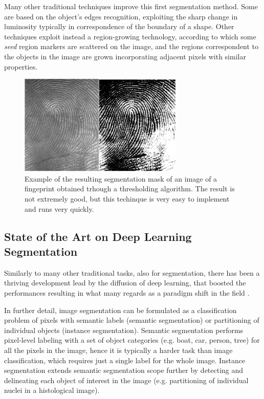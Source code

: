 Many other traditional techniques improve this first segmentation method. Some are based on the object's edges recognition, exploiting the sharp change in luminosity typically in correspondence of the boundary of a shape. Other techniques exploit instead a region-growing technology, according to which some \textit{seed} region markers are scattered on the image, and the regions correspondent to the objects in the image are grown incorporating adjacent pixels with similar properties.

\begin{figure}
    \centering
    \includegraphics[width = 0.7\textwidth]{images/fingerprints}
    \caption{Example of the resulting segmentation mask of an image of a fingeprint obtained trhough a thresholding algorithm. The result is not extremely good, but this techinque is very easy to implement and runs very quickly.}
    \label{fig:fing_prints}
\end{figure}

\subsection{State of the Art on Deep Learning Segmentation}
Similarly to many other traditional tasks, also for segmentation, there has been a thriving development lead by the diffusion of deep learning, that boosted the performances resulting in what many regards as
a paradigm shift in the field \cite{deep_seg_SOA}.

In further detail, image segmentation can be formulated as a classification problem of pixels with semantic labels (semantic segmentation) or partitioning of individual objects (instance segmentation). Semantic segmentation performs pixel-level labeling with a set of object categories (e.g. boat, car, person, tree) for all the pixels in the image, hence it is typically a harder task than image classification, which requires just a single label for the whole image. Instance segmentation extends semantic segmentation scope further by detecting and delineating each object of interest in the image (e.g. partitioning of individual nuclei in a histological image).

